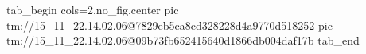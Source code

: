  
 
 
 
 

\qqSecOrig


\ifcmt
  tab_begin cols=2,no_fig,center
    pic tm://15_11_22.14.02.06@7829eb5ca8cd328228d4a9770d518252
    pic tm://15_11_22.14.02.06@09b73fb652415640d1866db004daf17b
  tab_end
\fi

